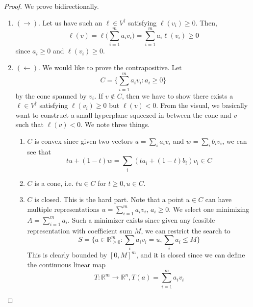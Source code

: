 	\begin{proof}
		We prove bidirectionally. 
		\begin{enumerate}
		  \item $(\rightarrow)$. Let us have such an $\ell \in V^\dagger$ satisfying $\ell(v_i) \geq 0$. Then, 
				\begin{equation}
					\ell(v) = \ell \bigg( \sum_{i=1}^m a_i v_i \bigg) = \sum_{i=1}^m a_i \ell(v_i) \geq 0
				\end{equation}
				since $a_i \geq 0$ and $\ell(v_i) \geq 0$. 

		  \item $(\leftarrow)$. We would like to prove the contrapositive. Let 
				\begin{equation}
					C = \bigg\{\sum_{i=1}^m a_i v_i \colon a_i \geq 0\bigg\}
				\end{equation}
				by the cone spanned by $v_i$. If $v \not\in C$, then we have to show there exists a $\ell \in V^\dagger$ satisfying $\ell(v_i) \geq 0$ but $\ell(v) < 0$. From the visual, we basically want to construct a small hyperplane squeezed in between the cone and $v$ such that $\ell(v) < 0$. We note three things. 
				\begin{enumerate}
				  \item $C$ is convex since given two vectors $u = \sum_i a_i v_i$ and $w = \sum_i b_i v_i$, we can see that 
						\begin{equation}
						  tu + (1 - t)w = \sum_i (ta_i + (1 - t)b_i) v_i \in C
						\end{equation}
					\item $C$ is a cone, i.e. $tu \in C$ for $t \geq 0, u \in C$. 
					\item $C$ is closed. This is the hard part. Note that a point $u \in C$ can have multiple representations $u = \sum_{i=1}^m a_i v_i$, $a_i \geq 0$. We select one minimizing $A = \sum_{i=1}^m a_i$. Such a minimizer exists since given any feasible representation with coefficient sum $M$, we can restrict the search to 
						\begin{equation}
							S = \bigg\{ a \in \mathbb{R}^m_{\geq 0} \colon \sum_i a_i v_i = u, \sum_i a_i \leq M \bigg\}
						\end{equation}
						This is clearly bounded by $[0, M]^m$, and it is closed since we can define the continuous \hyperref[lin-def:linear_map]{linear map} 
						\begin{equation}
							T: \mathbb{R}^m \to \mathbb{R}^n, T(a) = \sum_{i=1}^m a_i v_i
						\end{equation}

\end{enumerate}
\end{enumerate}
\end{proof}
